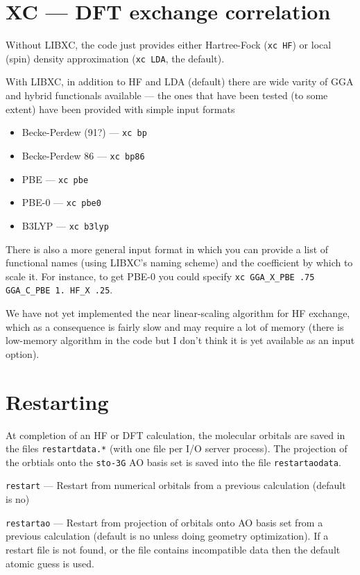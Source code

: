 \documentclass[letterpaper]{book}
\begin{document}
\section{XC --- DFT exchange correlation}

Without LIBXC, the code just provides either Hartree-Fock ({\tt xc HF}) or local (spin) density approximation ({\tt xc LDA}, the default).

With LIBXC, in addition to HF and LDA (default) there are wide varity of GGA and hybrid functionals available --- the ones that have been tested (to some extent) have been provided with simple input formats
\begin{itemize}
\item Becke-Perdew (91?) --- \verb+xc bp+
\item Becke-Perdew 86 --- \verb+xc bp86+
\item PBE --- \verb+xc pbe+
\item PBE-0 --- \verb+xc pbe0+
\item B3LYP --- \verb+xc b3lyp+
\end{itemize}

There is also a more general input format in which you can provide a list of functional names (using LIBXC's naming scheme) and the coefficient by which to scale it.  For instance, to get PBE-0 you could specify
\verb+xc GGA_X_PBE .75 GGA_C_PBE 1. HF_X .25+.

We have not yet implemented the near linear-scaling algorithm for HF
exchange, which as a consequence is fairly slow and may require a lot
of memory (there is low-memory algorithm in the code but I don't think
it is yet available as an input option).

\section{Restarting}

At completion of an HF or DFT calculation, the molecular orbitals are
saved in the files \verb+restartdata.*+ (with one file per I/O server
process).  The projection of the orbtials onto the {\tt sto-3G} AO basis
set is saved into the file {\tt restartaodata}.

{\tt restart} --- Restart from numerical orbitals from a previous calculation (default is no)

{\tt restartao} --- Restart from projection of orbitals onto AO basis
set from a previous calculation (default is no unless doing geometry
optimization).  If a restart file is not found, or the file contains
incompatible data then the default atomic guess is used.
\end{document}
